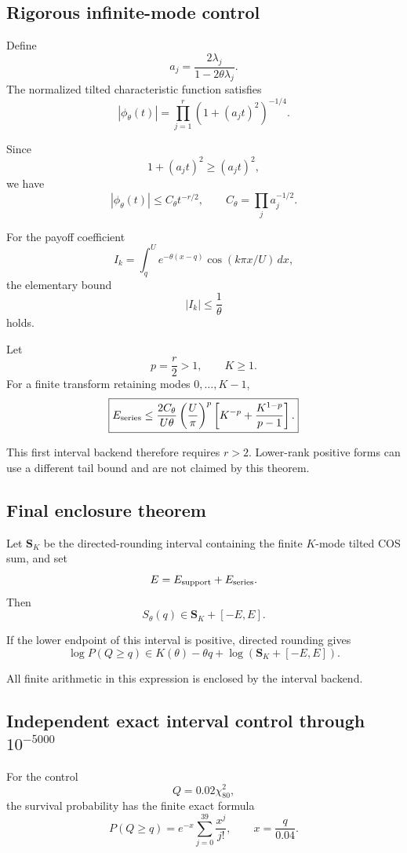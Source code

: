\documentclass[11pt]{article}
\theoremstyle{definition}
\theoremstyle{remark}
\begin{document}
\subsection{Rigorous infinite-mode control}

Define
\[
a_j=
\frac{2\lambda_j}{1-2\theta\lambda_j}.
\]
The normalized tilted characteristic function satisfies
\[
|\phi_\theta(t)|
=
\prod_{j=1}^r
\left(
1+(a_jt)^2
\right)^{-1/4}.
\]

Since
\[
1+(a_jt)^2\ge(a_jt)^2,
\]
we have
\[
|\phi_\theta(t)|
\le
C_\theta t^{-r/2},
\qquad
C_\theta=\prod_j a_j^{-1/2}.
\]

For the payoff coefficient
\[
I_k=
\int_q^U
e^{-\theta(x-q)}
\cos(k\pi x/U)\,dx,
\]
the elementary bound
\[
|I_k|\le\frac1\theta
\]
holds.

Let
\[
p=\frac r2>1,\qquad K\ge1.
\]
For a finite transform retaining modes \(0,\ldots,K-1\),
\[
\boxed{
E_{\rm series}
\le
\frac{2C_\theta}{U\theta}
\left(\frac{U}{\pi}\right)^p
\left[
K^{-p}
+
\frac{K^{1-p}}{p-1}
\right].
}
\]

This first interval backend therefore requires \(r>2\).  Lower-rank positive
forms can use a different tail bound and are not claimed by this theorem.

\subsection{Final enclosure theorem}

Let \(\boldsymbol S_K\) be the directed-rounding interval containing the finite
\(K\)-mode tilted COS sum, and set
\[
E=E_{\rm support}+E_{\rm series}.
\]
Then
\[
\boxed{
S_\theta(q)
\in
\boldsymbol S_K+[-E,E].
}
\]

If the lower endpoint of this interval is positive, directed rounding gives
\[
\boxed{
\log P(Q\ge q)
\in
K(\theta)-\theta q
+
\log\left(
\boldsymbol S_K+[-E,E]
\right).
}
\]

All finite arithmetic in this expression is enclosed by the interval backend.

\subsection{Independent exact interval control through \texorpdfstring{\(10^{-5000}\)}{1e-5000}}

For the control
\[
Q=0.02\chi^2_{80},
\]
the survival probability has the finite exact formula
\[
P(Q\ge q)
=
e^{-x}
\sum_{j=0}^{39}
\frac{x^j}{j!},
\qquad
x=\frac{q}{0.04}.
\]
\end{document}
